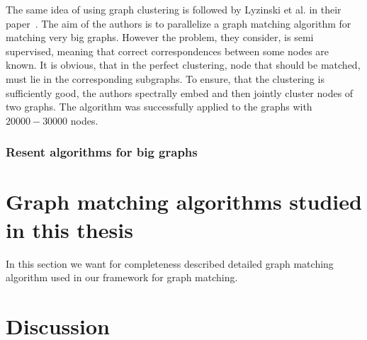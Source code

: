 The same idea of using graph clustering is followed by Lyzinski et al. in their paper~\cite{Lyzinski2015}. The aim of the authors is to parallelize a graph matching algorithm for matching very big graphs. However the problem, they consider, is semi supervised, meaning that correct correspondences between some nodes are known. It is obvious, that in the perfect clustering, node that should be matched, must lie in the corresponding subgraphs. To ensure, that the clustering is sufficiently good, the authors spectrally embed and then jointly cluster nodes of two graphs. The algorithm was successfully applied to the graphs with $20000-30000$ nodes.

\subsubsection{Resent algorithms for big graphs}

\section{Graph matching algorithms studied in this thesis}
In this section we want for completeness described detailed graph matching algorithm used in our framework for graph matching.

\section{Discussion}